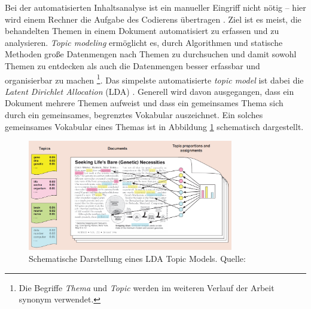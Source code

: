 \documentclass[12pt, 
    twoside=false, 
    bibliography=totoc, 
    numbers=endperiod, 
    headings=normal, 
    toc=chapterentrydotfill
    ]{scrbook}
\begin{document}
Bei der automatisierten Inhaltsanalyse ist ein manueller Eingriff nicht nötig -- hier wird einem Rechner die Aufgabe des Codierens übertragen \parencite[161]{brosius_2012}. Ziel ist es meist, die behandelten Themen in einem Dokument automatisiert zu erfassen \parencite[36f.]{niekler_2018} und zu analysieren. \emph{Topic modeling} ermöglicht es, durch Algorithmen und statische Methoden große Datenmengen nach Themen zu durchsuchen und damit sowohl Themen zu entdecken als auch die Datenmengen besser erfassbar und organisierbar zu machen \parencites[vgl.][77ff.]{blei_2012}[vgl.][163]{brosius_2012}\footnote{Die Begriffe \emph{Thema} und \emph{Topic} werden im weiteren Verlauf der Arbeit synonym verwendet.}. Das simpelste automatisierte \emph{topic model} ist dabei die \emph{Latent Dirichlet Allocation} (LDA) \parencite[78]{blei_2012}. Generell wird davon ausgegangen, dass ein Dokument mehrere Themen aufweist \parencites[78]{blei_2012}[88]{niekler_2018} und dass ein gemeinsames Thema sich durch ein gemeinsames, begrenztes Vokabular auszeichnet.
Ein solches gemeinsames Vokabular eines Themas ist in Abbildung \ref{fig:lda_example} schematisch dargestellt.

\begin{figure}
    \centering
    \includegraphics[width=0.8\textwidth]{document/images/lda_topic_model.png}
    \caption[Schematische Darstellung eines LDA Topic Models]{Schematische Darstellung eines LDA Topic Models. Quelle:  \parencite{blei_2012}}
    \label{fig:lda_example}
\end{figure}
\end{document}
